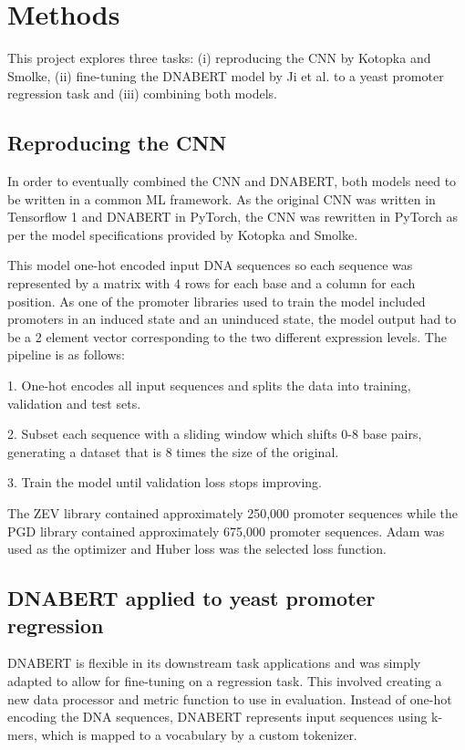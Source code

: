 \documentclass{article}
\begin{document}
\section{Methods}
This project explores three tasks: (i) reproducing the CNN by Kotopka and Smolke, (ii) fine-tuning the DNABERT model by Ji et al. to a yeast promoter regression task and (iii) combining both models. 

\subsection{Reproducing the CNN}
In order to eventually combined the CNN and DNABERT, both models need to be written in a common ML framework. As the original CNN was written in Tensorflow 1 and DNABERT in PyTorch, the CNN was rewritten in PyTorch as per the model specifications provided by Kotopka and Smolke.

This model one-hot encoded input DNA sequences so each sequence was represented by a matrix with 4 rows for each base and a column for each position. As one of the promoter libraries used to train the model included promoters in an induced state and an uninduced state, the model output had to be a 2 element vector corresponding to the two different expression levels. The pipeline is as follows:

1. One-hot encodes all input sequences and splits the data into training, validation and test sets.

2. Subset each sequence with a sliding window which shifts 0-8 base pairs, generating a dataset that is 8 times the size of the original.

3. Train the model until validation loss stops improving.

The ZEV library contained approximately 250,000 promoter sequences while the PGD library contained approximately 675,000 promoter sequences. Adam was used as the optimizer and Huber loss was the selected loss function. 

\subsection{DNABERT applied to yeast promoter regression}
DNABERT is flexible in its downstream task applications and was simply adapted to allow for fine-tuning on a regression task. This involved creating a new data processor and metric function to use in evaluation. Instead of one-hot encoding the DNA sequences, DNABERT represents input sequences using k-mers, which is mapped to a vocabulary by a custom tokenizer.

\printbibliography
\end{document}

